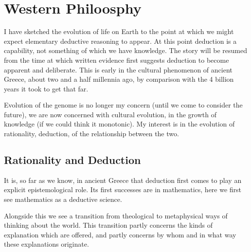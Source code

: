 
\part{Western Philoosphy}\label{partII}

I have sketched the evolution of life on Earth to the point at which we might expect elementary deductive reasoning to appear.
At this point deduction is a capability, not something of which we have knowledge.
The story will be resumed from the time at which written evidence first suggests deduction to become apparent and deliberate.
This is early in the cultural phenomenon of ancient Greece, about two and a half millennia ago, by comparison with the 4 billion years it took to get that far.

Evolution of the genome is no longer my concern (until we come to consider the future), we are now concerned with cultural evolution, in the growth of knowledge (if we could think it monotonic).
My interest is in the evolution of rationality, deduction, of the relationship between the two.

\chapter{Rationality and Deduction}

It is, so far as we know, in ancient Greece that deduction first comes to play an explicit epistemological role.
Its first successes are in mathematics, here we first see mathematics as a deductive science.

Alongside this we see a transition from theological to metaphysical ways of thinking about the world.
This transition partly concerns the kinds of explanation which are offered, and partly concerns by whom and in what way these explanations originate.

